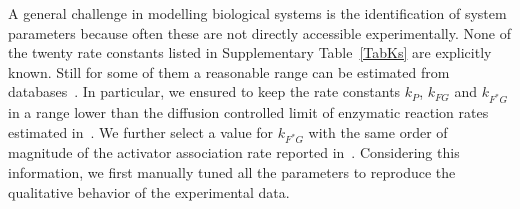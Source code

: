 \documentclass[oneside, 10pt, a4paper, twocolumn]{article}
\begin{document}
A general challenge in modelling biological systems is the identification of system parameters because often these are not directly accessible experimentally.
{None of the twenty rate constants listed in Supplementary Table~\ref{TabKs} are explicitly known.
Still for some of them a reasonable range can be estimated from databases~\cite{Milo2010}. 
In particular, we ensured to keep the rate constants $k_P$, $k_{FG}$ and $k_{F^*G}$ in a range 
lower than the diffusion controlled limit of enzymatic reaction rates estimated 
in~\cite[Table 6-8]{Nelson2004}. We further select a value for $k_{F^*G}$ with the same order of magnitude of the activator association rate reported in~\cite{Sanchez2011}.
Considering this information, we first manually tuned all the parameters to reproduce the qualitative behavior of the experimental data.} 
\end{document}
